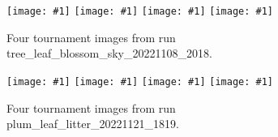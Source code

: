 \documentclass[letterpaper]{article}
\newcommand{\runID}{\footnotesize}
\newcommand{\igfour}[1]{\texttt{[image: \#1]}}
\begin{document}



\begin{figure}[t]
    \igfour{20221108_2018_step_4655.png}
    \hfill
    \igfour{20221108_2018_step_5498.png}
    \hfill
    \igfour{20221108_2018_step_5947.png}
    \hfill
    \igfour{20221108_2018_step_6562.png}
    \caption{Four tournament images from run {\runID tree\_leaf\_blossom\_sky\_20221108\_2018}.}
    \label{fig:tree_leaf_blossom_sky_4x}
\end{figure}

\begin{figure}[t]
    \igfour{20221121_1819_step_6324.png}
    \hfill
    \igfour{20221121_1819_step_6464.png}
    \hfill
    \igfour{20221121_1819_step_6677.png}
    \hfill
    \igfour{20221121_1819_step_6755.png}
    \caption{Four tournament images from run {\runID plum\_leaf\_litter\_20221121\_1819}.}
    \label{fig:plum_leaf_litter_4x}
\end{figure}
\end{document}
